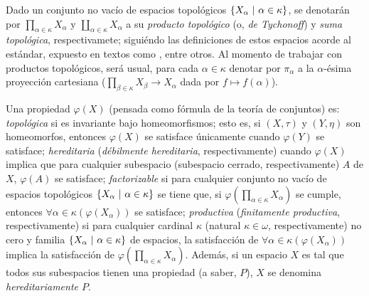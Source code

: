     Dado un conjunto no vacío de espacios topológicos $\{X_\alpha \text{ $|$ } \alpha \in \kappa \}$, se denotarán por $ \prod_{\alpha \in \kappa} X_\alpha$ y $ \coprod_{\alpha \in \kappa} X_\alpha$ a su \textit{producto topológico} (o, \textit{de Tychonoff}) y \textit{suma topológica}, respectivamete; siguiéndo las definiciones de estos espacios acorde al estándar, expuesto en textos como \cite{fidelElementos,munkresTopology}, entre otros. Al momento de trabajar con productos topológicos, será usual, para cada $\alpha \in \kappa$ denotar por $\pi_\alpha$ a la $\alpha$-ésima proyección cartesiana ($ \prod_{\beta \in \kappa} X_\beta \to X_\alpha$ dada por $f \mapsto f(\alpha)$).

    Una propiedad $\varphi(X)$ (pensada como fórmula de la teoría de conjuntos) es: \textit{topológica} si es invariante bajo homeomorfismos; esto es, si $(X,\tau)$ y $(Y,\eta)$ son homeomorfos, entonces $\varphi(X)$ se satisface únicamente cuando $\varphi(Y)$ se satisface; \textit{hereditaria} (\textit{débilmente hereditaria}, respectivamente) cuando $\varphi(X)$ implica que para cualquier subespacio (subespacio cerrado, respectivamente) $A$ de $X$, $\varphi(A)$ se satisface; \textit{factorizable} si para cualquier conjunto no vacío de espacios topológicos $\{X_\alpha \text{ $|$ } \alpha \in \kappa \}$ se tiene que, si $\varphi(\prod_{\alpha \in \kappa} X_\alpha)$ se cumple, entonces $\forall \alpha \in \kappa (\varphi(X_\alpha))$ se satisface; \textit{productiva} (\textit{finitamente productiva}, respectivamente) si para cualquier cardinal $\kappa$ (natural $\kappa \in \omega$, respectivamente) no cero y familia $\{X_\alpha \text{ $|$ } \alpha \in \kappa \}$ de espacios, la satisfacción de $\forall \alpha \in \kappa (\varphi(X_\alpha))$ implica la satisfacción de $\varphi(\prod_{\alpha \in \kappa} X_\alpha)$. Además, si un espacio $X$ es tal que todos sus subespacios tienen una propiedad (a saber, $P$), $X$ se denomina \textit{hereditariamente $P$}.

